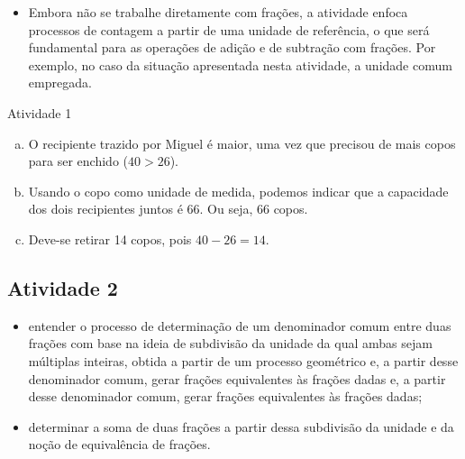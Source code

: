  \vspace{.15cm}
\begin{itemize} %
  \item     Embora não se trabalhe diretamente com frações, a atividade enfoca processos de contagem a partir de uma unidade de referência, o que será fundamental para as operações de adição e de subtração com frações. Por exemplo, no caso da situação apresentada nesta atividade, a unidade comum empregada.
\end{itemize} %
\newpage
  \begin{multicols}{2}
\begin{resposta*}{Atividade 1}
 \begin{enumerate}[a)]
  \item O recipiente trazido por Miguel é maior, uma vez que precisou de mais copos para ser enchido ($40>26$).
  \item Usando o copo como unidade de medida, podemos indicar que a capacidade dos dois recipientes juntos é 66. Ou seja, 66 copos.
  \item Deve-se retirar 14 copos, pois $40 - 26=14$.
 \end{enumerate}

\end{resposta*}


\subsection{Atividade 2}

  \newline \vspace{.15cm}

\begin{itemize} %
    \item       entender o processo de determinação de um denominador comum entre duas frações com base na ideia de subdivisão da unidade da qual ambas sejam múltiplas inteiras, obtida a partir de um processo geométrico e, a partir desse denominador comum, gerar frações equivalentes às frações dadas e, a partir desse denominador comum, gerar frações equivalentes às frações dadas;
    \item       determinar a soma de duas frações a partir dessa subdivisão da unidade e da noção de equivalência de frações.
\end{itemize} %


   \vspace{.15cm}


\end{multicols}
